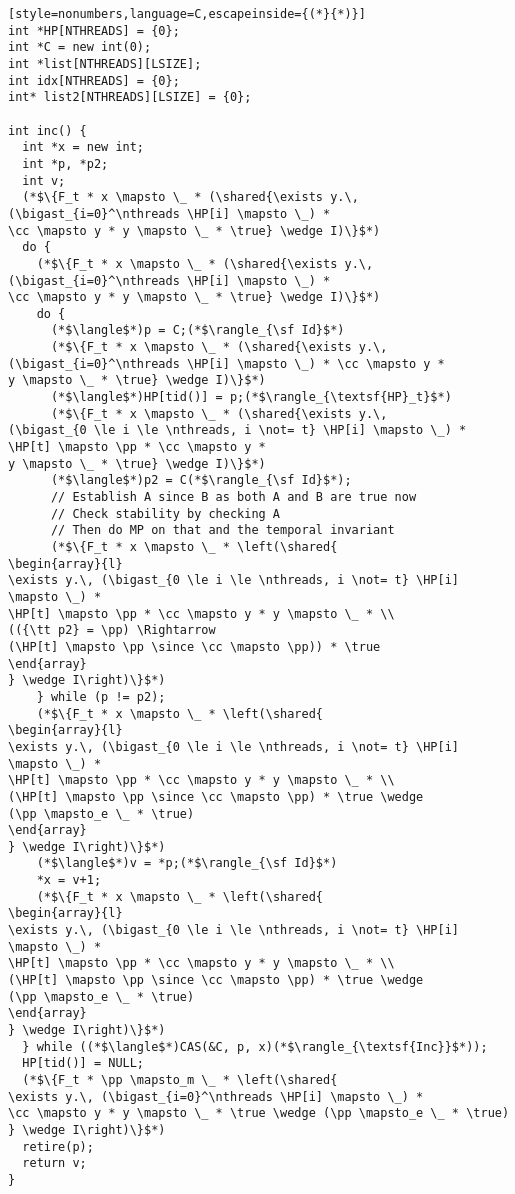 {\small
\begin{lstlisting}[style=nonumbers,language=C,escapeinside={(*}{*)}]
int *HP[NTHREADS] = {0};
int *C = new int(0);
int *list[NTHREADS][LSIZE];
int idx[NTHREADS] = {0};
int* list2[NTHREADS][LSIZE] = {0};

int inc() {
  int *x = new int;
  int *p, *p2;
  int v;
  (*$\{F_t * x \mapsto \_ * (\shared{\exists y.\, 
(\bigast_{i=0}^\nthreads \HP[i] \mapsto \_) *
\cc \mapsto y * y \mapsto \_ * \true} \wedge I)\}$*)
  do {
    (*$\{F_t * x \mapsto \_ * (\shared{\exists y.\, 
(\bigast_{i=0}^\nthreads \HP[i] \mapsto \_) *
\cc \mapsto y * y \mapsto \_ * \true} \wedge I)\}$*)
    do {
      (*$\langle$*)p = C;(*$\rangle_{\sf Id}$*)
      (*$\{F_t * x \mapsto \_ * (\shared{\exists y.\, 
(\bigast_{i=0}^\nthreads \HP[i] \mapsto \_) * \cc \mapsto y * 
y \mapsto \_ * \true} \wedge I)\}$*)
      (*$\langle$*)HP[tid()] = p;(*$\rangle_{\textsf{HP}_t}$*)
      (*$\{F_t * x \mapsto \_ * (\shared{\exists y.\, 
(\bigast_{0 \le i \le \nthreads, i \not= t} \HP[i] \mapsto \_) * 
\HP[t] \mapsto \pp * \cc \mapsto y * 
y \mapsto \_ * \true} \wedge I)\}$*)
      (*$\langle$*)p2 = C(*$\rangle_{\sf Id}$*);
      // Establish A since B as both A and B are true now
      // Check stability by checking A
      // Then do MP on that and the temporal invariant
      (*$\{F_t * x \mapsto \_ * \left(\shared{
\begin{array}{l}
\exists y.\, (\bigast_{0 \le i \le \nthreads, i \not= t} \HP[i] \mapsto \_) * 
\HP[t] \mapsto \pp * \cc \mapsto y * y \mapsto \_ * \\
(({\tt p2} = \pp) \Rightarrow
(\HP[t] \mapsto \pp \since \cc \mapsto \pp)) * \true
\end{array}
} \wedge I\right)\}$*)
    } while (p != p2);
    (*$\{F_t * x \mapsto \_ * \left(\shared{
\begin{array}{l}
\exists y.\, (\bigast_{0 \le i \le \nthreads, i \not= t} \HP[i] \mapsto \_) * 
\HP[t] \mapsto \pp * \cc \mapsto y * y \mapsto \_ * \\
(\HP[t] \mapsto \pp \since \cc \mapsto \pp) * \true \wedge 
(\pp \mapsto_e \_ * \true)
\end{array}
} \wedge I\right)\}$*)
    (*$\langle$*)v = *p;(*$\rangle_{\sf Id}$*)
    *x = v+1;
    (*$\{F_t * x \mapsto \_ * \left(\shared{
\begin{array}{l}
\exists y.\, (\bigast_{0 \le i \le \nthreads, i \not= t} \HP[i] \mapsto \_) * 
\HP[t] \mapsto \pp * \cc \mapsto y * y \mapsto \_ * \\
(\HP[t] \mapsto \pp \since \cc \mapsto \pp) * \true \wedge 
(\pp \mapsto_e \_ * \true)
\end{array}
} \wedge I\right)\}$*)
  } while ((*$\langle$*)CAS(&C, p, x)(*$\rangle_{\textsf{Inc}}$*));
  HP[tid()] = NULL;
  (*$\{F_t * \pp \mapsto_m \_ * \left(\shared{
\exists y.\, (\bigast_{i=0}^\nthreads \HP[i] \mapsto \_) * 
\cc \mapsto y * y \mapsto \_ * \true \wedge (\pp \mapsto_e \_ * \true)
} \wedge I\right)\}$*)
  retire(p);
  return v;
}


\end{lstlisting}}

